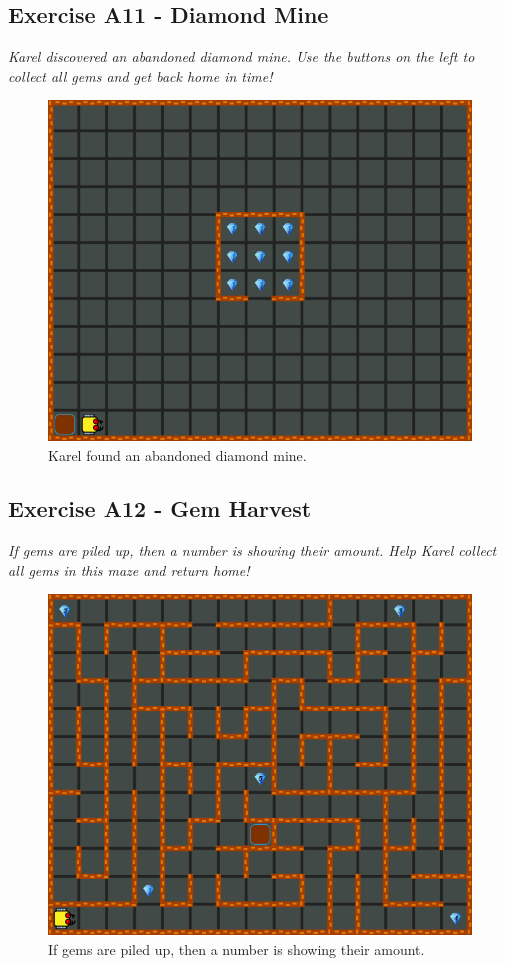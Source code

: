 \documentclass[article,A4,12pt]{llncs}
\begin{document}
\subsection{Exercise A11 - Diamond Mine}

{\em Karel discovered an abandoned diamond mine. Use the buttons
on the left to collect all gems and get back home in time!}

\begin{figure}[!ht]
\begin{center}
\includegraphics[height=0.4\textwidth]{img/a11.png}
\end{center}
\vspace{-4mm}
\caption{Karel found an abandoned diamond mine.}
\label{fig:a11}
\vspace{-4mm}
\end{figure}
\noindent
\newpage

\subsection{Exercise A12 - Gem Harvest}

{\em If gems are piled up, then a number is showing their amount. 
Help Karel collect all gems in this maze and return home!}\\[-7mm]

\begin{figure}[!ht]
\begin{center}
\includegraphics[height=0.4\textwidth]{img/a12.png}
\end{center}
\vspace{-4mm}
\caption{If gems are piled up, then a number is showing their amount.}
\label{fig:a12}
\vspace{-4mm}
\end{figure}
\noindent
\end{document}
